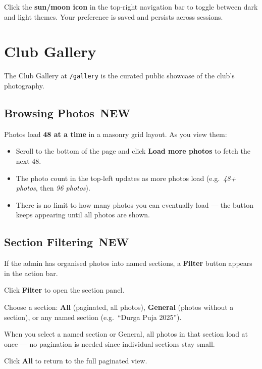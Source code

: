 \documentclass[12pt,a4paper]{article}
\newcommand{\newbadge}{%
  \colorbox{NewFrame}{\color{white}\,\textbf{\footnotesize NEW}\,}%
}
\begin{document}
Click the \textbf{sun/moon icon} in the top-right navigation bar to toggle between dark and light themes. Your preference is saved and persists across sessions.

\section{Club Gallery}
\label{sec:gallery}

The Club Gallery at \texttt{/gallery} is the curated public showcase of the club's photography.

\subsection{Browsing Photos \newbadge}

Photos load \textbf{48 at a time} in a masonry grid layout. As you view them:

\begin{itemize}
  \item Scroll to the bottom of the page and click \textbf{Load more photos} to fetch the next 48.
  \item The photo count in the top-left updates as more photos load (e.g.\ \textit{48+ photos}, then \textit{96 photos}).
  \item There is no limit to how many photos you can eventually load --- the button keeps appearing until all photos are shown.
\end{itemize}

\subsection{Section Filtering \newbadge}

If the admin has organised photos into named sections, a \textbf{Filter} button appears in the action bar.

\begin{steps}
\item Click \textbf{Filter} to open the section panel.
\item Choose a section: \textbf{All} (paginated, all photos), \textbf{General} (photos without a section), or any named section (e.g.\ ``Durga Puja 2025'').
\item When you select a named section or General, all photos in that section load at once --- no pagination is needed since individual sections stay small.
\item Click \textbf{All} to return to the full paginated view.
\end{steps}
\end{document}
